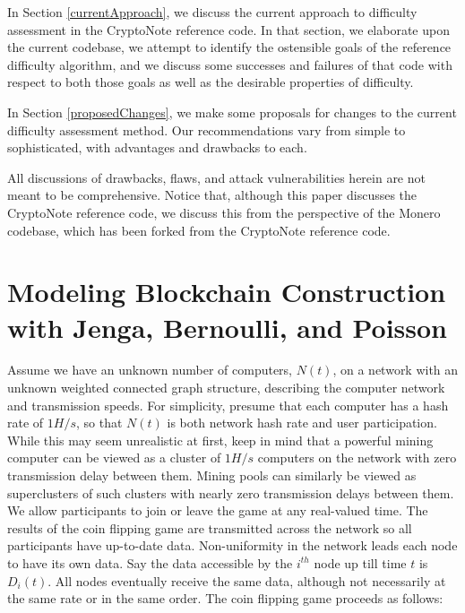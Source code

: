 \documentclass[12pt,english]{mrl}
\theoremstyle{definition}
\numberwithin{equation}{section}
\numberwithin{figure}{section}
\numberwithin{equation}{section}
\numberwithin{equation}{section}
\numberwithin{figure}{section}
\begin{document}
In Section \ref{currentApproach}, we discuss the current approach to difficulty assessment in the CryptoNote reference code. In that section, we elaborate upon the current codebase, we attempt to identify the ostensible goals of the reference difficulty algorithm, and we discuss some successes and failures of that code with respect to both those goals as well as the desirable properties of difficulty.

In Section \ref{proposedChanges}, we make some proposals for changes to the current difficulty assessment method. Our recommendations vary from simple to sophisticated, with advantages and drawbacks to each.

All discussions of drawbacks, flaws, and attack vulnerabilities herein are not meant to be comprehensive. Notice that, although this paper discusses the CryptoNote reference code, we discuss this from the perspective of the Monero codebase, which has been forked from the CryptoNote reference code.

\section{Modeling Blockchain Construction with Jenga, Bernoulli, and Poisson}\label{model}

Assume we have an unknown number of computers, $N(t)$, on a network with an unknown weighted connected graph structure, describing the computer network and transmission speeds. For simplicity, presume that each computer has a hash rate of $1 H/s$, so that $N(t)$ is both network hash rate and user participation. While this may seem unrealistic at first, keep in mind that a powerful mining computer can be viewed as a cluster of $1 H/s$ computers on the network with zero transmission delay between them. Mining pools can similarly be viewed as superclusters of such clusters with nearly zero transmission delays between them. We allow participants to join or leave the game at any real-valued time. The results of the coin flipping game are transmitted across the network so all participants have up-to-date data. Non-uniformity in the network leads each node to have its own data. Say the data accessible by the $i^{th}$ node up till time $t$ is $D_i(t)$. All nodes eventually receive the same data, although not necessarily at the same rate or in the same order. The coin flipping game proceeds as follows:
\end{document}
